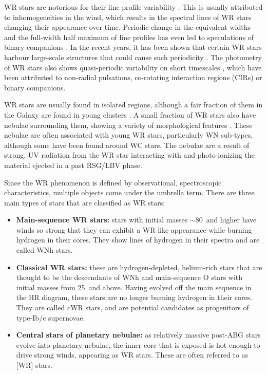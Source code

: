 WR stars are notorious for their line-profile variability \citep{lepine_wind_1996,lepine_wind_2000,st-louis_systematic_2009,chene_systematic_2011,chene_clumping_2020}. This is usually attributed to inhomogeneities in the wind, which results in the spectral lines of WR stars changing their appearance over time. Periodic change in the equivalent widths and the full-width half maximum of line profiles has even led to speculations of binary companions \citep[e.g. WR 1][]{morel_investigation_1999}. In the recent years, it has been shown that certain WR stars harbour large-scale structures that could cause such periodicity \citep[e.g.][]{st-louis_measuring_2008,aldoretta_extensive_2016,st-louis_polarization_2018}. The photometry of WR stars also shows quasi-periodic variability on short timescales \citep[e.g.][]{moffat_photometric_1986,balona_intensive_1989,st-louis_brite_2020}, which have been attributed to non-radial pulsations, co-rotating interaction regions (CIRs) or binary companions.

WR stars are usually found in isolated regions, although a fair fraction of them in the Galaxy are found in young clusters \citep{rosslowe_spatial_2015}. A small fraction of WR stars also have nebulae surrounding them, showing a variety of morphological features \citep{toala_wise_2015}. These nebulae are often associated with young WR stars, particularly WN sub-types, although some have been found around WC stars. The nebulae are a result of strong, UV radiation from the WR star interacting with and photo-ionizing the material ejected in a past RSG/LBV phase.

Since the WR phenomenon is defined by observational, spectroscopic characteristics, multiple objects come under the umbrella term. There are three main types of stars that are classified as WR stars:

\begin{itemize}
    \item \textbf{Main-sequence WR stars:} stars with initial masses ${\sim}80\,$\Msun{} and higher have winds so strong that they can exhibit a WR-like appearance while burning hydrogen in their cores. They show lines of hydrogen in their spectra and are called WNh stars.
    \item \textbf{Classical WR stars:} these are hydrogen-depleted, helium-rich stars that are thought to be the descendants of WNh and main-sequence O stars with initial masses from 25\,\Msun{} and above. Having evolved off the main sequence in the HR diagram, these stars are no longer burning hydrogen in their cores. They are called cWR stars, and are potential candidates as progenitors of type-Ib/c supernovae.
    \item \textbf{Central stars of planetary nebulae:} as relatively massive post-ABG stars evolve into planetary nebulae, the inner core that is exposed is hot enough to drive strong winds, appearing as WR stars. These are often referred to as [WR] stars.
\end{itemize}

